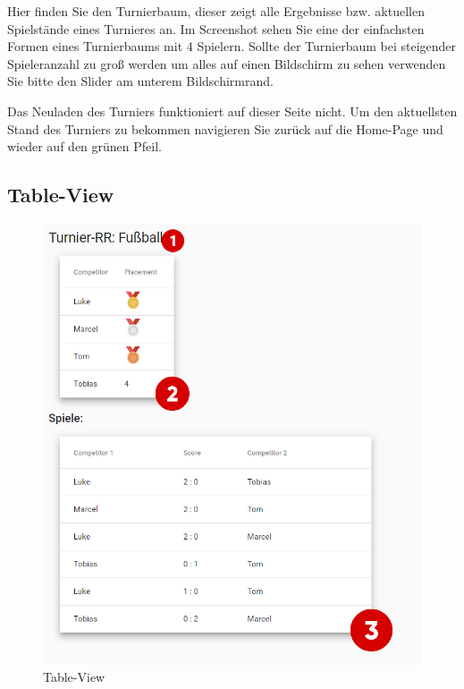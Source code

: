 Hier finden Sie den Turnierbaum, dieser zeigt alle Ergebnisse bzw. aktuellen Spielstände eines Turnieres an.
Im Screenshot sehen Sie eine der einfachsten Formen eines Turnierbaums mit 4 Spielern. Sollte der Turnierbaum bei
steigender Spieleranzahl zu groß werden um alles auf einen Bildschirm zu sehen verwenden Sie bitte den Slider am unterem Bildschirmrand.

Das Neuladen des Turniers funktioniert auf dieser Seite nicht. Um den aktuellsten Stand des Turniers zu bekommen navigieren Sie zurück auf die Home-Page und wieder auf den grünen Pfeil.

\bigskip
\subsection{Table-View}
\begin{figure}[H]
    \includegraphics[scale=0.5]{pics/user-guide/table-view.PNG}
    \caption{Table-View}
\end{figure}
\bigskip
